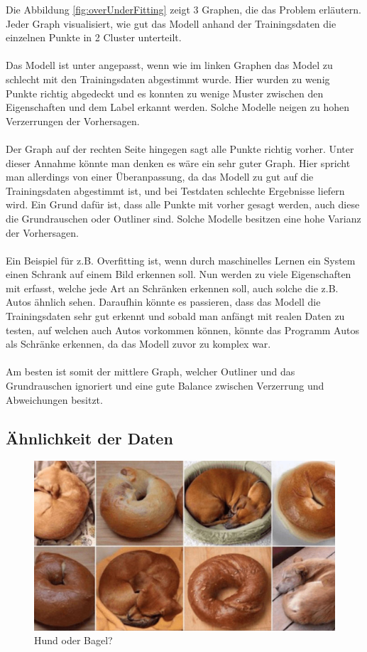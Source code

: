 \documentclass[12pt,oneside,a4paper,parskip]{scrbook}
\begin{document}
Die Abbildung \ref{fig:overUnderFitting} zeigt 3 Graphen, die das Problem erläutern. Jeder Graph visualisiert, wie gut das Modell anhand der Trainingsdaten die einzelnen Punkte in 2 Cluster unterteilt.
\\\\
Das Modell ist unter angepasst, wenn wie im linken Graphen das Model zu schlecht mit den Trainingsdaten abgestimmt wurde. Hier wurden zu wenig Punkte richtig abgedeckt und es konnten zu wenige Muster zwischen den Eigenschaften und dem Label erkannt werden. Solche Modelle neigen zu hohen Verzerrungen der Vorhersagen.
\\\\
Der Graph auf der rechten Seite hingegen sagt alle Punkte richtig vorher. Unter dieser Annahme könnte man denken es wäre ein sehr guter Graph. Hier spricht man allerdings von einer Überanpassung, da das Modell zu gut auf die Trainingsdaten abgestimmt ist, und bei Testdaten schlechte Ergebnisse liefern wird. Ein Grund dafür ist, dass alle Punkte mit vorher gesagt werden, auch diese die Grundrauschen oder Outliner sind. Solche Modelle besitzen eine hohe Varianz der Vorhersagen\cite{overUnderfitting}.
\\\\
Ein Beispiel für z.B. Overfitting ist, wenn durch maschinelles Lernen ein System einen Schrank auf einem Bild erkennen soll. Nun werden zu viele Eigenschaften mit erfasst, welche jede Art an Schränken erkennen soll, auch solche die z.B. Autos ähnlich sehen. Daraufhin könnte es passieren, dass das Modell die Trainingsdaten sehr gut erkennt und sobald man anfängt mit realen Daten zu testen, auf welchen auch Autos vorkommen können, könnte das Programm Autos als Schränke erkennen, da das Modell zuvor zu komplex war.
\\\\
Am besten ist somit der mittlere Graph, welcher Outliner und das Grundrauschen ignoriert und eine gute Balance zwischen Verzerrung und Abweichungen besitzt.
\subsection{Ähnlichkeit der Daten}
\label{section:similarData}
\begin{figure}[h]
	\begin{center}
		\includegraphics[width=15cm]{Bilder/dog_or_bagel.jpg}
		\caption{Hund oder Bagel?}
		\label{fig:dogBagel}
	\end{center}
\end{figure}
\end{document}

